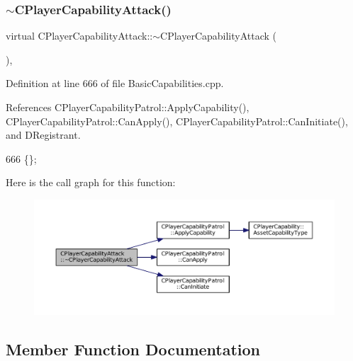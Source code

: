 \subsubsection{\texorpdfstring{$\sim$\+C\+Player\+Capability\+Attack()}{~CPlayerCapabilityAttack()}}
{\footnotesize\ttfamily virtual C\+Player\+Capability\+Attack\+::$\sim$\+C\+Player\+Capability\+Attack (\begin{DoxyParamCaption}{ }\end{DoxyParamCaption})\hspace{0.3cm}{\ttfamily [inline]}, {\ttfamily [virtual]}}



Definition at line 666 of file Basic\+Capabilities.\+cpp.



References C\+Player\+Capability\+Patrol\+::\+Apply\+Capability(), C\+Player\+Capability\+Patrol\+::\+Can\+Apply(), C\+Player\+Capability\+Patrol\+::\+Can\+Initiate(), and D\+Registrant.


\begin{DoxyCode}
666 \{\};
\end{DoxyCode}
Here is the call graph for this function\+:\nopagebreak
\begin{figure}[H]
\begin{center}
\leavevmode
\includegraphics[width=350pt]{classCPlayerCapabilityAttack_ac18875f6e891a2e8b805ed42bb001bb3_cgraph}
\end{center}
\end{figure}


\subsection{Member Function Documentation}
\hypertarget{classCPlayerCapabilityAttack_a536095f572f9f6af786eaec0376f3771}{}\label{classCPlayerCapabilityAttack_a536095f572f9f6af786eaec0376f3771} 
